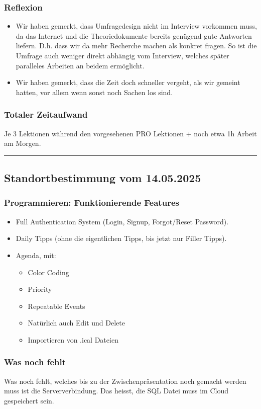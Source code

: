 \documentclass[a4paper,12pt]{article}
\newcommand{\StandortHeader}[1]{
    \subsection*{Standortbestimmung vom #1}
}
\newcommand{\StandortFooter}{
    \vspace{0.5cm}
    \hrule
    \vspace{0.5cm}
}
\begin{document}
\subsubsection*{Reflexion}
\begin{itemize}
    \item Wir haben gemerkt, dass Umfragedesign nicht im Interview vorkommen muss, da das Internet und die Theoriedokumente bereits genügend gute Antworten liefern. D.h. dass wir da mehr Recherche machen als konkret fragen. So ist die Umfrage auch weniger direkt abhängig vom Interview, welches später paralleles Arbeiten an beidem ermöglicht.
    \item Wir haben gemerkt, dass die Zeit doch schneller vergeht, als wir gemeint hatten, vor allem wenn sonst noch Sachen los sind.
\end{itemize}

\subsubsection*{Totaler Zeitaufwand}
Je 3 Lektionen während den vorgesehenen PRO Lektionen + noch etwa 1h Arbeit am Morgen.
\StandortFooter

\StandortHeader{14.05.2025}
\subsubsection*{Programmieren: Funktionierende Features}
\begin{itemize}
    \item Full Authentication System (Login, Signup, Forgot/Reset Password).
    \item Daily Tipps (ohne die eigentlichen Tipps, bis jetzt nur Filler Tipps).
    \item Agenda, mit:
    \begin{itemize}
        \item Color Coding
        \item Priority
        \item Repeatable Events
        \item Natürlich auch Edit und Delete
        \item Importieren von .ical Dateien
    \end{itemize}
\end{itemize}

\subsubsection*{Was noch fehlt}
Was noch fehlt, welches bis zu der Zwischenpräsentation noch gemacht werden muss ist die Serververbindung. Das heisst, die SQL Datei muss im Cloud gespeichert sein.
\end{document}
